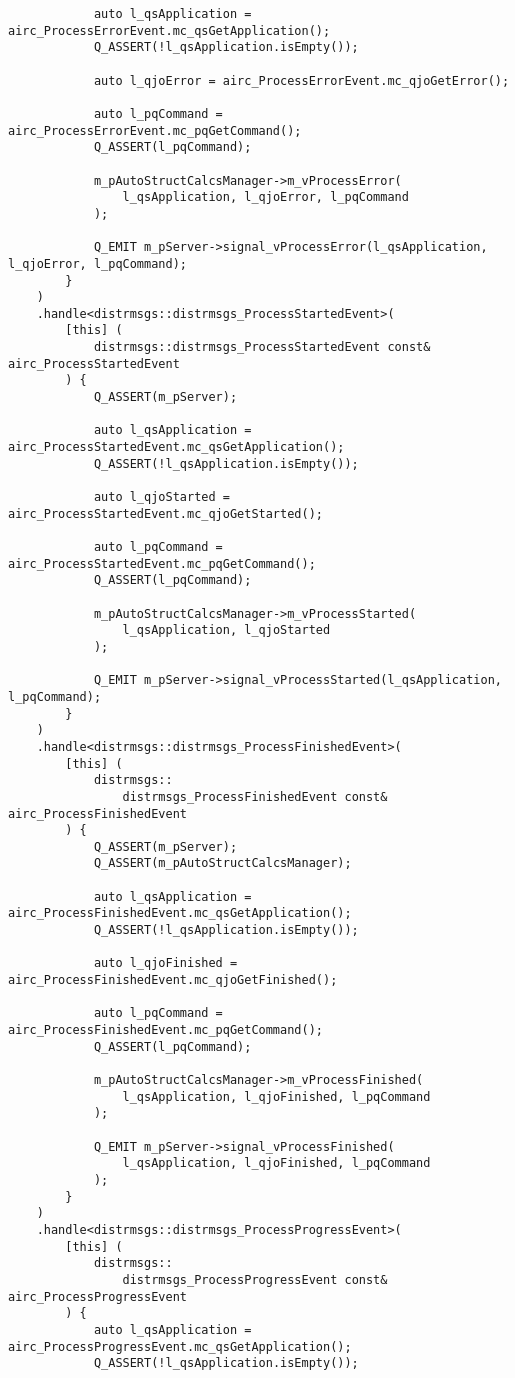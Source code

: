 \begin{verbatim}
            auto l_qsApplication =  airc_ProcessErrorEvent.mc_qsGetApplication();
            Q_ASSERT(!l_qsApplication.isEmpty());

            auto l_qjoError = airc_ProcessErrorEvent.mc_qjoGetError();

            auto l_pqCommand = airc_ProcessErrorEvent.mc_pqGetCommand();
            Q_ASSERT(l_pqCommand);

            m_pAutoStructCalcsManager->m_vProcessError(
                l_qsApplication, l_qjoError, l_pqCommand
            );

            Q_EMIT m_pServer->signal_vProcessError(l_qsApplication, l_qjoError, l_pqCommand);
        }
    )
    .handle<distrmsgs::distrmsgs_ProcessStartedEvent>(
        [this] (
            distrmsgs::distrmsgs_ProcessStartedEvent const& airc_ProcessStartedEvent
        ) {
            Q_ASSERT(m_pServer);

            auto l_qsApplication =  airc_ProcessStartedEvent.mc_qsGetApplication();
            Q_ASSERT(!l_qsApplication.isEmpty());

            auto l_qjoStarted = airc_ProcessStartedEvent.mc_qjoGetStarted();

            auto l_pqCommand = airc_ProcessStartedEvent.mc_pqGetCommand();
            Q_ASSERT(l_pqCommand);

            m_pAutoStructCalcsManager->m_vProcessStarted(
                l_qsApplication, l_qjoStarted
            );

            Q_EMIT m_pServer->signal_vProcessStarted(l_qsApplication, l_pqCommand);
        }
    )
    .handle<distrmsgs::distrmsgs_ProcessFinishedEvent>(
        [this] (
            distrmsgs::
                distrmsgs_ProcessFinishedEvent const& airc_ProcessFinishedEvent
        ) {
            Q_ASSERT(m_pServer);
            Q_ASSERT(m_pAutoStructCalcsManager);

            auto l_qsApplication = airc_ProcessFinishedEvent.mc_qsGetApplication();
            Q_ASSERT(!l_qsApplication.isEmpty());

            auto l_qjoFinished = airc_ProcessFinishedEvent.mc_qjoGetFinished();

            auto l_pqCommand = airc_ProcessFinishedEvent.mc_pqGetCommand();
            Q_ASSERT(l_pqCommand);

            m_pAutoStructCalcsManager->m_vProcessFinished(
                l_qsApplication, l_qjoFinished, l_pqCommand
            );

            Q_EMIT m_pServer->signal_vProcessFinished(
                l_qsApplication, l_qjoFinished, l_pqCommand
            );
        }
    )
    .handle<distrmsgs::distrmsgs_ProcessProgressEvent>(
        [this] (
            distrmsgs::
                distrmsgs_ProcessProgressEvent const& airc_ProcessProgressEvent
        ) {
            auto l_qsApplication = airc_ProcessProgressEvent.mc_qsGetApplication();
            Q_ASSERT(!l_qsApplication.isEmpty());


\end{verbatim}
